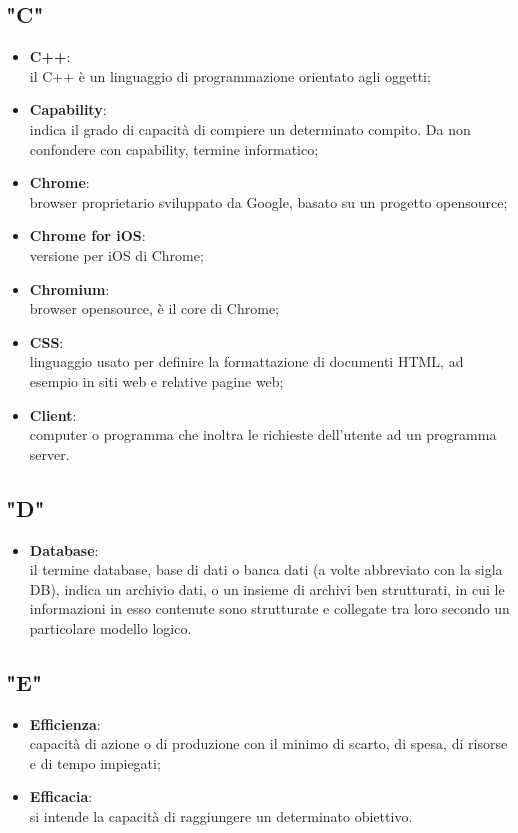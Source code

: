 \subsection{"C"}
\begin{itemize}
\item \textbf{C++}:\\ il C++ è un linguaggio di programmazione orientato agli oggetti;
\item \textbf{Capability}:\\ indica il grado di capacità di compiere un determinato compito. Da non confondere con capability, termine informatico;
\item \textbf{Chrome}:\\ browser proprietario sviluppato da Google, basato su un progetto opensource;
\item \textbf{Chrome for iOS}:\\ versione per iOS di Chrome;
\item \textbf{Chromium}:\\ browser opensource, è il core di Chrome;
\item \textbf{CSS}:\\ linguaggio usato per definire la formattazione di documenti HTML, ad esempio in siti web e relative pagine web;
\item \textbf{Client}:\\ computer o programma che inoltra le richieste dell’utente ad un programma server.
\end{itemize}

\subsection{"D"}
\begin{itemize}
\item \textbf{Database}:\\ il termine database, base di dati o banca dati (a volte abbreviato con la sigla DB), indica un archivio dati, o un insieme di archivi ben strutturati, in cui le informazioni in esso contenute sono strutturate e collegate tra loro secondo un particolare modello logico.
\end{itemize}

\subsection{"E"}
\begin{itemize}
\item \textbf{Efficienza}:\\ capacità di azione o di produzione con il minimo di scarto, di spesa, di risorse e di tempo impiegati; 
\item \textbf{Efficacia}:\\ si intende la capacità di raggiungere un determinato obiettivo.
\end{itemize}

